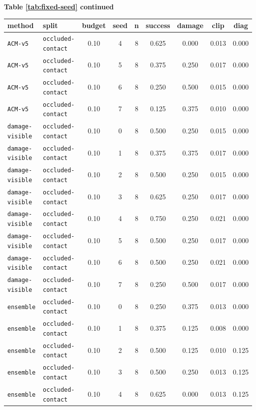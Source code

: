 \documentclass{article}
\begin{document}
\begin{center}
\textbf{Table \ref{tab:fixed-seed} continued}\\[0.4ex]
\begin{tabular}{llccccccc}
\toprule
method & split & budget & seed & n & success & damage & clip & diag \\
\midrule
\texttt{ACM-v5} & \texttt{occluded-contact} & 0.10 & 4 & 8 & 0.625 & 0.000 & 0.013 & 0.000 \\
\texttt{ACM-v5} & \texttt{occluded-contact} & 0.10 & 5 & 8 & 0.375 & 0.250 & 0.017 & 0.000 \\
\texttt{ACM-v5} & \texttt{occluded-contact} & 0.10 & 6 & 8 & 0.250 & 0.500 & 0.015 & 0.000 \\
\texttt{ACM-v5} & \texttt{occluded-contact} & 0.10 & 7 & 8 & 0.125 & 0.375 & 0.010 & 0.000 \\
\texttt{damage-visible} & \texttt{occluded-contact} & 0.10 & 0 & 8 & 0.500 & 0.250 & 0.015 & 0.000 \\
\texttt{damage-visible} & \texttt{occluded-contact} & 0.10 & 1 & 8 & 0.375 & 0.375 & 0.017 & 0.000 \\
\texttt{damage-visible} & \texttt{occluded-contact} & 0.10 & 2 & 8 & 0.500 & 0.250 & 0.015 & 0.000 \\
\texttt{damage-visible} & \texttt{occluded-contact} & 0.10 & 3 & 8 & 0.625 & 0.250 & 0.017 & 0.000 \\
\texttt{damage-visible} & \texttt{occluded-contact} & 0.10 & 4 & 8 & 0.750 & 0.250 & 0.021 & 0.000 \\
\texttt{damage-visible} & \texttt{occluded-contact} & 0.10 & 5 & 8 & 0.500 & 0.250 & 0.017 & 0.000 \\
\texttt{damage-visible} & \texttt{occluded-contact} & 0.10 & 6 & 8 & 0.500 & 0.250 & 0.021 & 0.000 \\
\texttt{damage-visible} & \texttt{occluded-contact} & 0.10 & 7 & 8 & 0.250 & 0.500 & 0.017 & 0.000 \\
\texttt{ensemble} & \texttt{occluded-contact} & 0.10 & 0 & 8 & 0.250 & 0.375 & 0.013 & 0.000 \\
\texttt{ensemble} & \texttt{occluded-contact} & 0.10 & 1 & 8 & 0.375 & 0.125 & 0.008 & 0.000 \\
\texttt{ensemble} & \texttt{occluded-contact} & 0.10 & 2 & 8 & 0.500 & 0.125 & 0.010 & 0.125 \\
\texttt{ensemble} & \texttt{occluded-contact} & 0.10 & 3 & 8 & 0.500 & 0.250 & 0.013 & 0.125 \\
\texttt{ensemble} & \texttt{occluded-contact} & 0.10 & 4 & 8 & 0.625 & 0.000 & 0.013 & 0.125 \\

\end{tabular}
\end{center}
\end{document}
